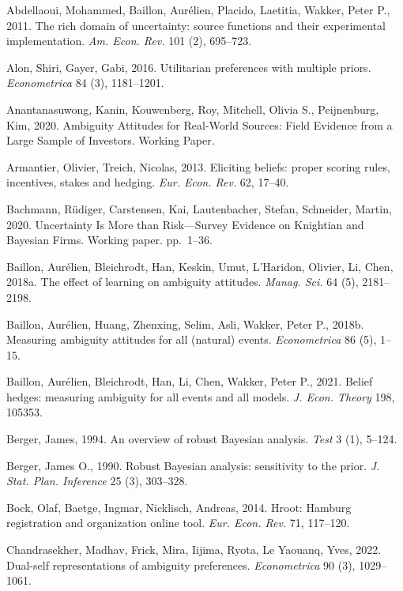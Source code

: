 \documentclass[12pt,a4paper]{article}
\newenvironment{original}
  {\par\medskip\noindent\color{black}\ignorespaces}
  {\par\medskip}
\begin{document}
\begin{original}
\small
\noindent Abdellaoui, Mohammed, Baillon, Aur\'{e}lien, Placido, Laetitia, Wakker, Peter P., 2011. The rich domain of uncertainty: source functions and their experimental implementation. \textit{Am. Econ. Rev.} 101 (2), 695--723.

\noindent Alon, Shiri, Gayer, Gabi, 2016. Utilitarian preferences with multiple priors. \textit{Econometrica} 84 (3), 1181--1201.

\noindent Anantanasuwong, Kanin, Kouwenberg, Roy, Mitchell, Olivia S., Peijnenburg, Kim, 2020. Ambiguity Attitudes for Real-World Sources: Field Evidence from a Large Sample of Investors. Working Paper.

\noindent Armantier, Olivier, Treich, Nicolas, 2013. Eliciting beliefs: proper scoring rules, incentives, stakes and hedging. \textit{Eur. Econ. Rev.} 62, 17--40.

\noindent Bachmann, R\"{u}diger, Carstensen, Kai, Lautenbacher, Stefan, Schneider, Martin, 2020. Uncertainty Is More than Risk---Survey Evidence on Knightian and Bayesian Firms. Working paper. pp.\ 1--36.

\noindent Baillon, Aur\'{e}lien, Bleichrodt, Han, Keskin, Umut, L'Haridon, Olivier, Li, Chen, 2018a. The effect of learning on ambiguity attitudes. \textit{Manag. Sci.} 64 (5), 2181--2198.

\noindent Baillon, Aur\'{e}lien, Huang, Zhenxing, Selim, Asli, Wakker, Peter P., 2018b. Measuring ambiguity attitudes for all (natural) events. \textit{Econometrica} 86 (5), 1--15.

\noindent Baillon, Aur\'{e}lien, Bleichrodt, Han, Li, Chen, Wakker, Peter P., 2021. Belief hedges: measuring ambiguity for all events and all models. \textit{J. Econ. Theory} 198, 105353.

\noindent Berger, James, 1994. An overview of robust Bayesian analysis. \textit{Test} 3 (1), 5--124.

\noindent Berger, James O., 1990. Robust Bayesian analysis: sensitivity to the prior. \textit{J. Stat. Plan. Inference} 25 (3), 303--328.

\noindent Bock, Olaf, Baetge, Ingmar, Nicklisch, Andreas, 2014. Hroot: Hamburg registration and organization online tool. \textit{Eur. Econ. Rev.} 71, 117--120.

\noindent Chandrasekher, Madhav, Frick, Mira, Iijima, Ryota, Le Yaouanq, Yves, 2022. Dual-self representations of ambiguity preferences. \textit{Econometrica} 90 (3), 1029--1061.


\end{original}
\end{document}
